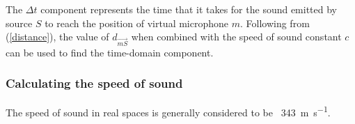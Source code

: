 The $\Delta{}t$ component represents the time that it takes for the sound emitted by source $S$ to reach the position of virtual microphone $m$. Following from (\ref{distance}), the value of $d_{\vec{mS}}$ when combined with the speed of sound constant $c$ can be used to find the time-domain component.

\subsubsection{Calculating the speed of sound}

The speed of sound in real spaces is generally considered to be ~\SI[per-mode=fraction]{343}{\m\per\s}. 